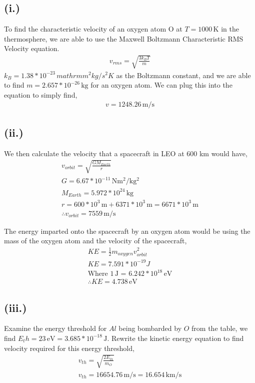 \documentclass[11pt]{article}
\begin{document}
\subsection*{(i.)}
\hspace*{2em}To find the characteristic velocity of an oxygen atom O at $T = 1000 \, \mathrm{K}$ in the thermosphere,
we are able to use the Maxwell Boltzmann Characteristic RMS Velocity equation.
\[
\begin{gathered}
v_{rms} = \sqrt{ \frac{3k_B T}{m} }
\end{gathered}
\]
\hspace*{2em}$k_B = 1.38*10^{-23} \, mathrm{m^2 kg / s^2 K}$ as the Boltzmann constant, and
we are able to find $m = 2.657*10^{-26} \, \mathrm{kg}$ for an oxygen atom. We can plug this
into the equation to simply find,
\[
\begin{gathered}
\boxed{v = 1248.26 \, \mathrm{m/s}}
\end{gathered}
\]

\subsection*{(ii.)}
\hspace*{2em}We then calculate the velocity that a
spacecraft in LEO at 600 km would have,
\[
\begin{gathered}
v_{orbit} = \sqrt{\frac{GM_{Earth}}{r}} \\
G = 6.67*10^{-11} \, \mathrm{Nm^2/kg^2} \\
M_{Earth} = 5.972*10^{24} \, \mathrm{kg} \\
r = 600*10^3 \, \mathrm{m} + 6371*10^3 \, \mathrm{m} = 6671*10^3 \, \mathrm{m} \\
\therefore v_{orbit} = 7559 \, \mathrm{m/s}
\end{gathered}
\]

The energy imparted onto the spacecraft by an oxygen atom would be using the mass
of the oxygen atom and the velocity of the spacecraft,
\[
\begin{gathered}
KE = \frac{1}{2} m_{oxygen} v_{orbit}^2 \\
KE = 7.591*10^{-19} J \\
\text{Where $1\, \mathrm{J}$ = $6.242*10^{18} \, \mathrm{eV}$} \\
\boxed{\therefore KE = 4.738 \, \mathrm{eV}}
\end{gathered}
\]

\subsection*{(iii.)}
\hspace*{2em}Examine the energy threshold for $Al$ being bombarded by $O$ from
the table, we find $E_th = 23\,\mathrm{eV} = 3.685*10^{-18}\,\mathrm{J}$. Rewrite
the kinetic energy equation to find velocity required for this energy threshold,
\[
\begin{gathered}
v_{th} = \sqrt{\frac{2 E_{th}}{m_O}} \\
v_{th} = 16654.76 \, \mathrm{m/s} = 16.654\,\mathrm{km/s}
\end{gathered}
\]
\end{document}
